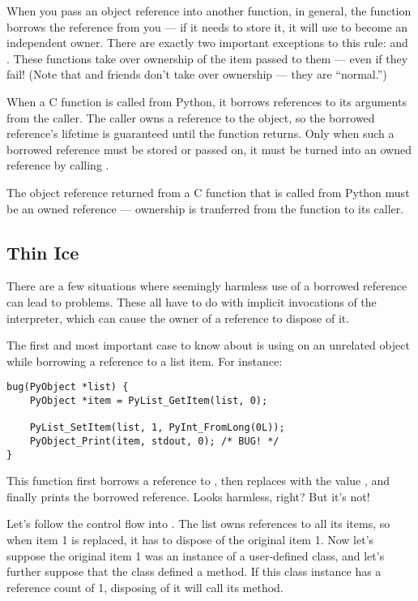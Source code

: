 \documentclass{manual}
\begin{document}
When you pass an object reference into another function, in general,
the function borrows the reference from you --- if it needs to store
it, it will use  to become an independent
owner.  There are exactly two important exceptions to this rule:
 and .  These
functions take over ownership of the item passed to them --- even if
they fail!  (Note that  and friends don't
take over ownership --- they are ``normal.'')

When a C function is called from Python, it borrows references to its
arguments from the caller.  The caller owns a reference to the object,
so the borrowed reference's lifetime is guaranteed until the function
returns.  Only when such a borrowed reference must be stored or passed
on, it must be turned into an owned reference by calling
.

The object reference returned from a C function that is called from
Python must be an owned reference --- ownership is tranferred from the
function to its caller.


\subsection{Thin Ice
            \label{thinIce}}

There are a few situations where seemingly harmless use of a borrowed
reference can lead to problems.  These all have to do with implicit
invocations of the interpreter, which can cause the owner of a
reference to dispose of it.

The first and most important case to know about is using
 on an unrelated object while borrowing a
reference to a list item.  For instance:

\begin{verbatim}
bug(PyObject *list) {
    PyObject *item = PyList_GetItem(list, 0);

    PyList_SetItem(list, 1, PyInt_FromLong(0L));
    PyObject_Print(item, stdout, 0); /* BUG! */
}
\end{verbatim}

This function first borrows a reference to , then
replaces  with the value , and finally prints
the borrowed reference.  Looks harmless, right?  But it's not!

Let's follow the control flow into .  The list
owns references to all its items, so when item 1 is replaced, it has
to dispose of the original item 1.  Now let's suppose the original
item 1 was an instance of a user-defined class, and let's further
suppose that the class defined a  method.  If this
class instance has a reference count of 1, disposing of it will call
its  method.
\end{document}
